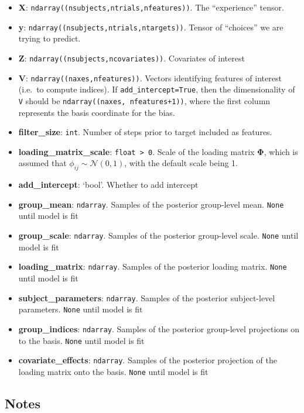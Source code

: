 \begin{itemize}
\tightlist
\item
  \textbf{X}: \texttt{ndarray((nsubjects,ntrials,nfeatures))}. The
  ``experience'' tensor.
\item
  \textbf{y}: \texttt{ndarray((nsubjects,ntrials,ntargets))}. Tensor of
  ``choices'' we are trying to predict.
\item
  \textbf{Z}: \texttt{ndarray((nsubjects,ncovariates))}. Covariates of
  interest
\item
  \textbf{V}: \texttt{ndarray((naxes,nfeatures))}. Vectors identifying
  features of interest (i.e.~to compute indices). If
  \texttt{add\_intercept=True}, then the dimensionality of \texttt{V}
  should be \texttt{ndarray((naxes,\ nfeatures+1))}, where the first
  column represents the basis coordinate for the bias.
\item
  \textbf{filter\_size}: \texttt{int}. Number of steps prior to target
  included as features.
\item
  \textbf{loading\_matrix\_scale}: \texttt{float\ \textgreater{}\ 0}.
  Scale of the loading matrix \(\boldsymbol\Phi\), which is assumed that
  \(\phi_{ij} \sim \mathcal N(0, 1)\), with the default scale being 1.
\item
  \textbf{add\_intercept}: `bool'. Whether to add intercept
\item
  \textbf{group\_mean}: \texttt{ndarray}. Samples of the posterior
  group-level mean. \texttt{None} until model is fit
\item
  \textbf{group\_scale}: \texttt{ndarray}. Samples of the posterior
  group-level scale. \texttt{None} until model is fit
\item
  \textbf{loading\_matrix}: \texttt{ndarray}. Samples of the posterior
  loading matrix. \texttt{None} until model is fit
\item
  \textbf{subject\_parameters}: \texttt{ndarray}. Samples of the
  posterior subject-level parameters. \texttt{None} until model is fit
\item
  \textbf{group\_indices}: \texttt{ndarray}. Samples of the posterior
  group-level projections on to the basis. \texttt{None} until model is
  fit
\item
  \textbf{covariate\_effects}: \texttt{ndarray}. Samples of the
  posterior projection of the loading matrix onto the basis.
  \texttt{None} until model is fit
\end{itemize}

\subsection{Notes}\label{notes}

